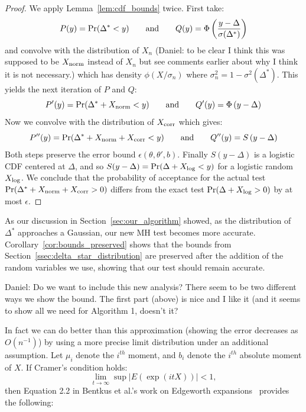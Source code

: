 \documentclass{article}
\begin{document}
\begin{proof}
We apply Lemma~\ref{lem:cdf_bounds} twice. First take:
\begin{equation}
    P(y) = {\rm Pr}(\Delta^* < y) \qquad {\rm and}\qquad Q(y) = \Phi\left(\frac{y-\Delta}{\sigma(\Delta^*)}\right)
\end{equation}
and convolve with the distribution of $X_n$ {\color{blue} (Daniel: to be clear I
think this was supposed to be $X_{\rm norm}$ instead of $X_n$ but see comments
earlier about why I think it is not necessary.)} which has density
$\phi(X/\sigma_n)$ where $\sigma_n^2 = 1 - \sigma^2(\Delta^*)$. This yields the
next iteration of $P$ and $Q$:
\begin{equation}
    P'(y) = {\rm Pr}(\Delta^*+X_{\rm norm} < y) \qquad {\rm and}\qquad Q'(y) = \Phi\left({y-\Delta}\right)
\end{equation}
Now we convolve with the distribution of $X_{\rm corr}$ which gives:
\begin{equation}
    P''(y) = {\rm Pr}(\Delta^*+X_{\rm norm}+X_{\rm corr} < y) \qquad {\rm and}\qquad Q''(y) = S\left({y-\Delta}\right)
\end{equation}
Both steps preserve the error bound $\epsilon(\theta,\theta',b)$. Finally
$S(y-\Delta)$ is a logistic CDF centered at $\Delta$, and so $S(y-\Delta) = {\rm
Pr}(\Delta + X_{\rm log} < y)$ for a logistic random $X_{\rm log}$. We conclude
that the probability of acceptance for the actual test ${\rm Pr}(\Delta^*+X_{\rm
norm}+X_{\rm corr} > 0)$ differs from the exact test ${\rm Pr}(\Delta+X_{\rm
log} > 0)$ by at most $\epsilon$.
\end{proof}

As our discussion in Section~\ref{sec:our_algorithm} showed, as the distribution
of $\Delta^*$ approaches a Gaussian, our new MH test becomes more accurate.
Corollary~\ref{cor:bounds_preserved} shows that the bounds from
Section~\ref{ssec:delta_star_distribution} are preserved after the addition of
the random variables we use, showing that our test should remain accurate.

{\color{blue} Daniel: Do we want to include this new analysis? There seem to be
two different ways we show the bound. The first part (above) is nice and I like
it (and it seems to show all we need for Algorithm 1, doesn't it?}

In fact we can do better than this approximation (showing the error decreases as
$O(n^{-1})$) by using a more precise limit distribution under an additional
assumption. Let $\mu_i$ denote the $i^{th}$ moment, and $b_i$ denote the
$i^{th}$ absolute moment of $X$. If Cramer's condition holds:
\begin{equation}\label{eq:cramers_condition}
    \lim_{t \to \infty} \sup |E(\exp(i t X))| < 1,
\end{equation}
then Equation 2.2 in Bentkus et al.'s work on Edgeworth
expansions~\cite{Bentkus97} provides the following:
\end{document}
